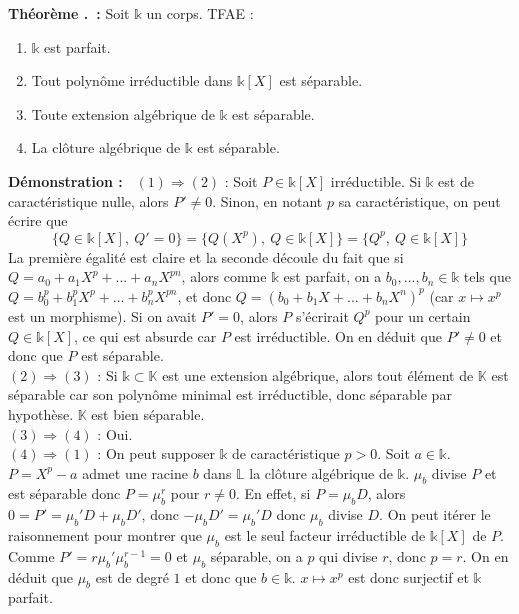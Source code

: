 \documentclass[5pt,a4paper]{article}
\newcounter{thmcounter}[subsection]
\renewcommand{\thethmcounter}{\thesubsection.\arabic{thmcounter}}
\newcommand{\thmEnum}[1]{
    \stepcounter{thmcounter}
    \hypertarget{t:\thethmcounter}{}%
    \noindent\textbf{Théorème \thethmcounter ~:} #1
}
\newcommand{\demo}[1]{
    \textbf{Démonstration :~} #1 \newline
}
\begin{document}
\begin{onehalfspacing}
\thmEnum{Soit $\mathds{k}$ un corps. TFAE :
	\begin{enumerate}
	\item $\mathds{k}$ est parfait.
	\item Tout polynôme irréductible dans $\mathds{k}[X]$ est séparable.
	\item Toute extension algébrique de $\mathds{k}$ est séparable.
	\item La clôture algébrique de $\mathds{k}$ est séparable.
	\end{enumerate}
}
\demo{$(1) \Rightarrow (2)$ : Soit $P \in \mathds{k}[X]$ irréductible. Si $\mathds{k}$ est de caractéristique nulle, alors $P' \neq 0$. Sinon, en notant $p$ sa caractéristique, on peut écrire que 
\[ \{Q \in \mathds{k}[X],~Q' = 0\} = \{Q(X^p),~Q \in \mathds{k}[X]\} = \{Q^p,~Q \in \mathds{k}[X]\} \]
La première égalité est claire et la seconde découle du fait que si $Q = a_0 + a_1X^p + ... + a_nX^{pn}$, alors comme $\mathds{k}$ est parfait, on a $b_0, ..., b_n \in \mathds{k}$ tels que $Q = b_0^p + b_1^pX^p + ... + b_n^pX^{pn}$, et donc $Q = (b_0 + b_1X + ... + b_nX^n)^p$ (car $x \mapsto x^p$ est un morphisme). Si on avait $P' = 0$, alors $P$ s'écrirait $Q^p$ pour un certain $Q \in \mathds{k}[X]$, ce qui est absurde car $P$ est irréductible. On en déduit que $P' \neq 0$ et donc que $P$ est séparable. 
\\$(2) \Rightarrow (3)$ : Si $\mathds{k} \subset \mathbb{K}$ est une extension algébrique, alors tout élément de $\mathbb{K}$ est séparable car son polynôme minimal est irréductible, donc séparable par hypothèse. $\mathbb{K}$ est bien séparable. 
\\$(3) \Rightarrow (4)$ : Oui. 
\\$(4) \Rightarrow (1)$ : On peut supposer $\mathds{k}$ de caractéristique $p > 0$. Soit $a \in \mathds{k}$. $P = X^p - a$ admet une racine $b$ dans $\mathbb{L}$ la clôture algébrique de $\mathds{k}$. $\mu_b$ divise $P$ et est séparable donc $P = \mu_b^r$ pour $r \neq 0$. En effet, si $P = \mu_bD$, alors $0 = P' = \mu_b'D + \mu_bD'$, donc $-\mu_bD' = \mu_b'D$ donc $\mu_b$ divise $D$. On peut itérer le raisonnement pour montrer que $\mu_b$ est le seul facteur irréductible de $\mathds{k}[X]$ de $P$. Comme $P' = r\mu_b'\mu_b^{r-1} = 0$ et $\mu_b$ séparable, on a $p$ qui divise $r$, donc $p = r$. On en déduit que $\mu_b$ est de degré $1$ et donc que $b \in \mathds{k}$. $x \mapsto x^p$ est donc surjectif et $\mathds{k}$ parfait.}



\end{onehalfspacing}
\end{document}
